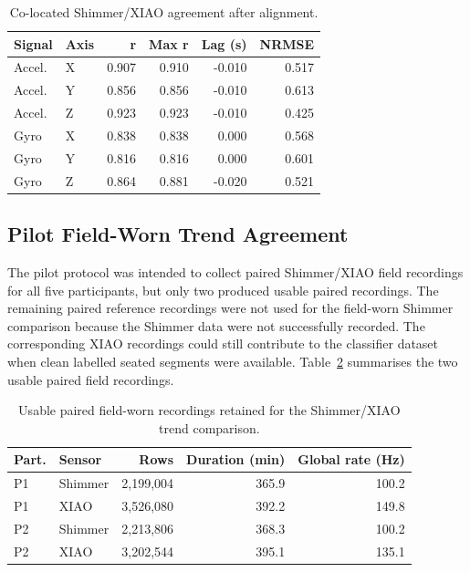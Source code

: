 \begin{table}[!htbp]
    \centering
    \scriptsize
    \caption{Co-located Shimmer/XIAO agreement after alignment.}
    \label{tab:colocated_validation_results}
    \begin{tabular*}{\linewidth}{@{\extracolsep{\fill}}llrrrr@{}}
        \toprule
        Signal & Axis & r & Max r & Lag (s) & NRMSE \\
        \midrule
        Accel. & X & 0.907 & 0.910 & -0.010 & 0.517 \\
        Accel. & Y & 0.856 & 0.856 & -0.010 & 0.613 \\
        Accel. & Z & 0.923 & 0.923 & -0.010 & 0.425 \\
        Gyro   & X & 0.838 & 0.838 &  0.000 & 0.568 \\
        Gyro   & Y & 0.816 & 0.816 &  0.000 & 0.601 \\
        Gyro   & Z & 0.864 & 0.881 & -0.020 & 0.521 \\
        \bottomrule
    \end{tabular*}
\end{table}

\subsection{Pilot Field-Worn Trend Agreement}

The pilot protocol was intended to collect paired Shimmer/XIAO field recordings for all five participants, but only two produced usable paired recordings. The remaining paired reference recordings were not used for the field-worn Shimmer comparison because the Shimmer data were not successfully recorded. The corresponding XIAO recordings could still contribute to the classifier dataset when clean labelled seated segments were available. Table~\ref{tab:field_recording_summary} summarises the two usable paired field recordings.

\begin{table}[!htbp]
    \centering
    \scriptsize
    \caption{Usable paired field-worn recordings retained for the Shimmer/XIAO trend comparison.}
    \label{tab:field_recording_summary}
    \begin{tabular*}{\linewidth}{@{\extracolsep{\fill}}llrrr@{}}
        \toprule
        Part. & Sensor & Rows & Duration (min) & Global rate (Hz) \\
        \midrule
        P1 & Shimmer & 2,199,004 & 365.9 & 100.2 \\
        P1 & XIAO    & 3,526,080 & 392.2 & 149.8 \\
        P2 & Shimmer & 2,213,806 & 368.3 & 100.2 \\
        P2 & XIAO    & 3,202,544 & 395.1 & 135.1 \\
        \bottomrule
    \end{tabular*}
\end{table}

